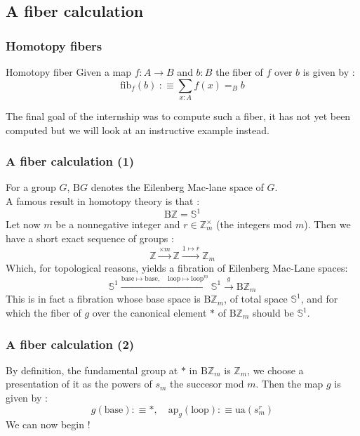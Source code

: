 \documentclass{beamer}
\begin{document}
    \subsection{A fiber calculation}
    \begin{frame}
        \frametitle{Homotopy fibers}
        \begin{exampleblock}{Homotopy fiber}
            Given a map $f : A \rightarrow B$ and $b : B$ the fiber of $f$ over $b$ is given by : 
            $$\mathrm{fib}_f(b) \hspace{3pt} :\equiv \sum_{x: A} f(x)=_B b$$
        \end{exampleblock}
        \pause
        The final goal of the internship was to compute such a fiber, it has not yet been computed but we will look at an instructive example instead.
    \end{frame}
    \begin{frame}
        \frametitle{A fiber calculation (1)}
        For a group $G$, $\mathrm{B}G$ denotes the Eilenberg Mac-lane space of $G$. \\
        \pause
        A famous result in homotopy theory is that : 
        $$\mathrm{B}\mathbb{Z} = \mathbb{S}^1$$
        \pause
        Let now $m$ be a nonnegative integer and $r \in \mathbb{Z}_m^{\times}$ (the integers mod $m$). Then we have a short exact sequence of groups : 
        $$\mathbb{Z} \xrightarrow{\times m} \mathbb{Z} \xrightarrow{1 \mapsto \overline r} \mathbb Z_m$$
        \pause
        Which, for  topological reasons, yields a fibration of Eilenberg Mac-Lane spaces:
        $$\mathbb{S}^1 \xrightarrow{\mathrm{base} \mapsto \mathrm{base}, \quad  \mathrm{loop} \mapsto \mathrm{loop}^m} \mathbb{S}^1 \xrightarrow{g} \mathrm{B}\mathbb{Z}_m$$
        This is in fact a fibration whose base space is $\mathrm{B}\mathbb{Z}_m$, of total space $\mathbb{S}^1$, and for which the fiber of $g$ over the canonical element $*$ of $\mathrm{B}\mathbb{Z}_m$ should be $\mathbb{S}^1$. 
    \end{frame}
    \begin{frame}
        \frametitle{A fiber calculation (2)}
        By definition, the fundamental group at $*$ in $\mathrm{B}\mathbb{Z}_m$ is $\mathbb{Z}_m$, we choose a presentation of it as the powers of $s_m$ the succesor mod $m$. Then the map $g$ is given by : 
        $$g(\mathrm{base}) :\equiv *, \quad \mathrm{ap}_g(\mathrm{loop}) :\equiv \mathrm{ua}(s_m^r)$$
        \pause
        We can now begin ! 
    \end{frame}
\end{document}
